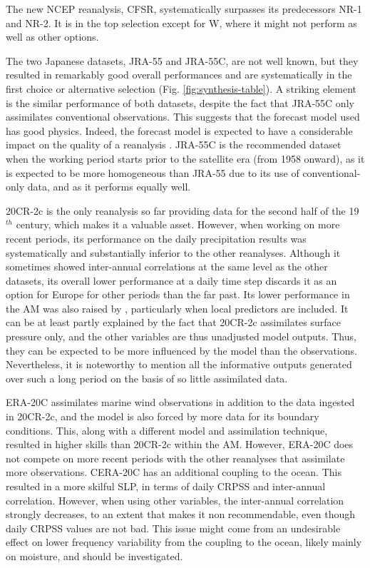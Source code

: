 \documentclass{ametsoc}
\begin{document}
The new NCEP reanalysis, CFSR, systematically surpasses its predecessors NR-1 and NR-2. It is in the top selection except for W, where it might not perform as well as other options.

The two Japanese datasets, JRA-55 and JRA-55C, are not well known, but they resulted in remarkably good overall performances and are systematically in the first choice or alternative selection (Fig. \ref{fig:synthesis-table}). A striking element is the similar performance of both datasets, despite the fact that JRA-55C only assimilates conventional observations. This suggests that the forecast model used has good physics. Indeed, the forecast model is expected to have a considerable impact on the quality of a reanalysis \citep{Kobayashi2015}. JRA-55C is the recommended dataset when the working period starts prior to the satellite era (from 1958 onward), as it is expected to be more homogeneous than JRA-55 due to its use of conventional-only data, and as it performs equally well.

20CR-2c is the only reanalysis so far providing data for the second half of the 19$^{th}$ century, which makes it a valuable asset. However, when working on more recent periods, its performance on the daily precipitation results was systematically and substantially inferior to the other reanalyses. Although it sometimes showed inter-annual correlations at the same level as the other datasets, its overall lower performance at a daily time step discards it as an option for Europe for other periods than the far past. Its lower performance in the AM was also raised by \citet[][]{Dayon2015}, particularly when local predictors are included. It can be at least partly explained by the fact that 20CR-2c assimilates surface pressure only, and the other variables are thus unadjusted model outputs. Thus, they can be expected to be more influenced by the model than the observations. Nevertheless, it is noteworthy to mention all the informative outputs generated over such a long period on the basis of so little assimilated data.

ERA-20C assimilates marine wind observations in addition to the data ingested in 20CR-2c, and the model is also forced by more data for its boundary conditions. This, along with a different model and assimilation technique, resulted in higher skills than 20CR-2c within the AM. However, ERA-20C does not compete on more recent periods with the other reanalyses that assimilate more observations. CERA-20C has an additional coupling to the ocean. This resulted in a more skilful SLP, in terms of daily CRPSS and inter-annual correlation. However, when using other variables, the inter-annual correlation strongly decreases, to an extent that makes it non recommendable, even though daily CRPSS values are not bad. This issue might come from an undesirable effect on lower frequency variability from the coupling to the ocean, likely mainly on moisture, and should be investigated.
\end{document}
